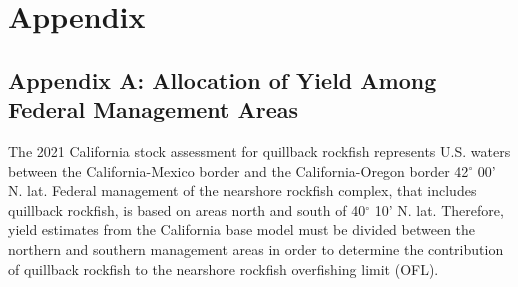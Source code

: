 \documentclass[11pt,
  english,
  a4paper,
]{article}
\begin{document}
\tagmcend\tagstructend

\newpage

\clearpage


\hypertarget{appendix}{%
\section{Appendix}\label{appendix}}

\leavevmode\tagmcend\tagstructend


\hypertarget{append_a}{%
\subsection{Appendix A: Allocation of Yield Among Federal Management Areas}\label{append_a}}

\leavevmode\tagmcend\tagstructend


The 2021 California stock assessment for quillback rockfish represents U.S. waters between the California-Mexico border and the California-Oregon border 42{\(^\circ\)\leavevmode\tagmcend\tagstructend} 00' N. lat. Federal management of the nearshore rockfish complex, that includes quillback rockfish, is based on areas north and south of 40{\(^\circ\)\leavevmode\tagmcend\tagstructend} 10' N. lat. Therefore, yield estimates from the California base model must be divided between the northern and southern management areas in order to determine the contribution of quillback rockfish to the nearshore rockfish overfishing limit (OFL).

\leavevmode\tagmcend\tagstructend\par

\end{document}

